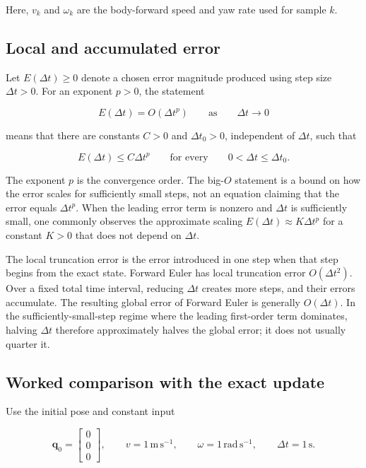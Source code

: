 \documentclass[
  australian,
  12pt,
  letterpaper,
  DIV=11,
  numbers=noendperiod,
  twoside]{scrreprt}
\begin{document}
Here, \(v_k\) and \(\omega_k\) are the body-forward speed and yaw rate
used for sample \(k\).

\subsection{Local and accumulated
error}\label{local-and-accumulated-error}

Let \(E(\Delta t)\geq0\) denote a chosen error magnitude produced using
step size \(\Delta t>0\). For an exponent \(p>0\), the statement

\[
E(\Delta t)=O(\Delta t^p)
\qquad\text{as}\qquad
\Delta t\to0
\]

means that there are constants \(C>0\) and \(\Delta t_0>0\), independent
of \(\Delta t\), such that

\[
E(\Delta t)\leq C\Delta t^p
\qquad
\text{for every}\qquad
0<\Delta t\leq\Delta t_0.
\]

The exponent \(p\) is the convergence order. The big-\(O\) statement is
a bound on how the error scales for sufficiently small steps, not an
equation claiming that the error equals \(\Delta t^p\). When the leading
error term is nonzero and \(\Delta t\) is sufficiently small, one
commonly observes the approximate scaling
\(E(\Delta t)\approx K\Delta t^p\) for a constant \(K>0\) that does not
depend on \(\Delta t\).

The local truncation error is the error introduced in one step when that
step begins from the exact state. Forward Euler has local truncation
error \(O(\Delta t^2)\). Over a fixed total time interval, reducing
\(\Delta t\) creates more steps, and their errors accumulate. The
resulting global error of Forward Euler is generally \(O(\Delta t)\). In
the sufficiently-small-step regime where the leading first-order term
dominates, halving \(\Delta t\) therefore approximately halves the
global error; it does not usually quarter it.

\subsection{Worked comparison with the exact
update}\label{worked-comparison-with-the-exact-update}

Use the initial pose and constant input

\[
\mathbf q_0=
\begin{bmatrix}
0\\
0\\
0
\end{bmatrix},
\qquad
v=1\,\mathrm{m\,s^{-1}},
\qquad
\omega=1\,\mathrm{rad\,s^{-1}},
\qquad
\Delta t=1\,\mathrm s.
\]
\end{document}
